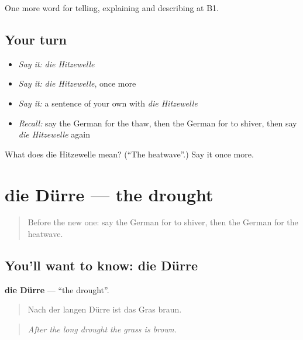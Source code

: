 \begin{grammarlens}[title={What you've built}]
One more word for telling, explaining and describing at B1.
\end{grammarlens}

\subsection*{Your turn}
\begin{itemize}
\raggedright
  \item \emph{Say it:} \emph{die Hitzewelle}
  \item \emph{Say it:} \emph{die Hitzewelle}, once more
  \item \emph{Say it:} a sentence of your own with \emph{die Hitzewelle}
  \item \emph{Recall:} say the German for the thaw, then the German for to shiver, then say \emph{die Hitzewelle} again
\end{itemize}

\begin{tcolorbox}[breakable,colback=teal!4,colframe=teal!35!black,title={Before you move on}]
What does die Hitzewelle mean? (\textquotedblleft{}The heatwave\textquotedblright{}.) Say it once more.
\end{tcolorbox}
\section[die Dürre]{die Dürre — the drought}

\label{lesson:GE-C464-duerre}



\begin{quote}
Before the new one: say the German for to shiver, then the German for the heatwave.
\end{quote}

\subsection*{You'll want to know: die Dürre}
\textbf{die Dürre} — \textquotedblleft{}the drought\textquotedblright{}.

\begin{quote}
Nach der langen Dürre ist das Gras braun.
\end{quote}

\begin{quote}
\emph{After the long drought the grass is brown.}
\end{quote}

